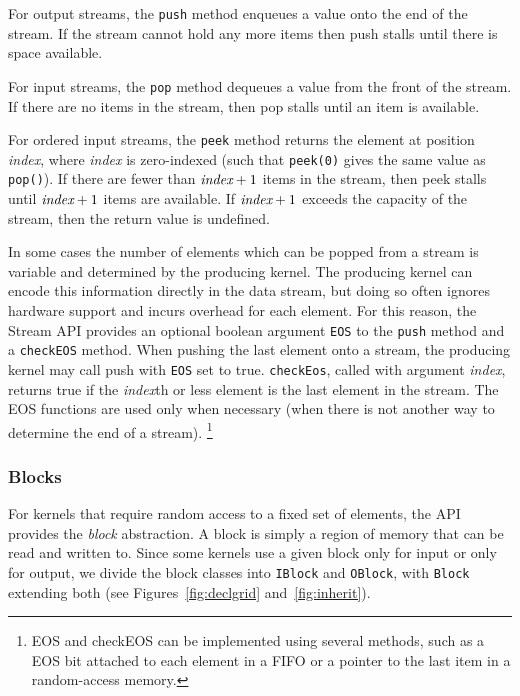  For output streams, the {\tt push} method enqueues a value
onto the end of the stream.  If the stream cannot hold any more items 
then push stalls until there is space available.

 For input streams, the {\tt pop} method dequeues a value
from the front of the stream.  If there are no items in the stream,
then pop stalls until an item is available. 

 For ordered input streams, the {\tt peek} method returns
the element at position {\it index}, where {\it index} is zero-indexed
(such that {\tt peek(0)} gives the same value as {\tt pop()}).  If
there are fewer than $\mbox{\it index}+1$ items in the stream,
then peek stalls until $\mbox{\it index}+1$ items are available.
If $\mbox{\it index}+1$ exceeds the capacity of the stream, then the 
return value is undefined.

 In some cases the number of elements which can 
be popped from a stream is variable and determined by the producing kernel. 
The producing kernel can encode this information directly in the data stream, 
but doing so often ignores hardware support and incurs overhead for each element.
For this reason, the Stream API provides an optional boolean argument 
{\tt EOS} to the {\tt push} method and a {\tt checkEOS} method. When pushing
the last element onto a stream, the producing kernel may call push
with {\tt EOS} set to true. {\tt checkEos}, called with argument  
{\it index}, returns true if the {\it index}th or less element is the last element
in the stream. The EOS functions are used only when necessary (when there is 
not another way to determine the end of a stream). \footnote{EOS and checkEOS can be 
implemented using several methods, such as a EOS bit attached to each element 
in a FIFO or a pointer to the last item in a random-access memory.}

\subsubsection{Blocks}
\label{sec:blocks}

For kernels that require random access to a fixed set of elements, the
API provides the {\it block} abstraction.  A block is simply a region
of memory that can be read and written to.  Since some kernels use a
given block only for input or only for output, we divide the block
classes into {\tt IBlock} and {\tt OBlock}, with {\tt Block} extending
both (see Figures~\ref{fig:declgrid} and~\ref{fig:inherit}).

